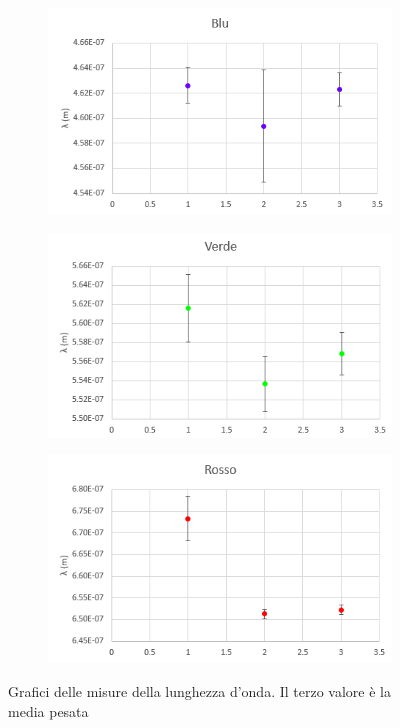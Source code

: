 \documentclass{article}
\begin{document}
\begin{figure}[h]
  \centering
  \begin{subfigure}[b]{0.3\linewidth}
    \includegraphics[width=\linewidth]{IM blu_lambda_2}
  \end{subfigure}
  \begin{subfigure}[b]{0.3\linewidth}
    \includegraphics[width=\linewidth]{IM verde_lambda_2}
  \end{subfigure}
  \begin{subfigure}[b]{0.3\linewidth}
    \includegraphics[width=\linewidth]{IM rosso_lambda_2}
  \end{subfigure}
  \caption{Grafici delle misure della lunghezza d'onda. Il terzo valore è la media pesata}
\end{figure}
\end{document}
